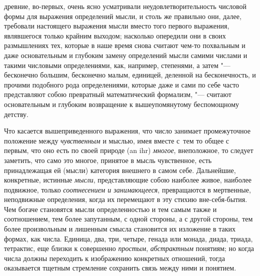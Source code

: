 древние, во-первых, очень ясно усматривали неудовлетворительность числовой
формы для выражения определений мысли, и столь же правильно они, далее,
требовали настоящего выражения мысли вместо того первого выражения, являвшегося
только крайним выходом; насколько опередили они в своих размышлениях тех,
которые в наше время снова считают чем-то похвальным и даже основательным и
глубоким замену определений мысли самими числами и такими числовыми
определениями, как, например, степенями, а затем "--- бесконечно большим,
бесконечно малым, единицей, деленной на бесконечность, и прочими подобного рода
определениями, которые даже и сами по себе часто представляют собою
превратный математический формализм, "--- считают основательным и глубоким
возвращение к вышеупомянутому беспомощному детству.

Что касается вышеприведенного выражения, что число занимает промежуточное
положение между {\em чувственным} и мыслью, имея вместе с~тем то общее с
первым, что оно есть по своей природе (an ihr) {\em многое}, внеположное, то
следует заметить, что само это многое, принятое в мысль чувственное, есть
принадлежащая ей (мысли) категория внешнего в самом себе. Дальнейшие,
конкретные, истинные {\em мысли}, представляющие собою наиболее живое, наиболее
подвижное, только {\em соотнесением и занимающееся}, превращаются в мертвенные,
неподвижные определения, когда их перемещают в эту стихию вне-себя-бытия. Чем
богаче становятся мысли определенностью и тем самым также и соотношением, тем
более запутанным, с одной стороны, а с другой стороны, тем более произвольным и
лишенным смысла становится их изложение в таких формах, как числа. Единица,
два, три, четыре, генада или монада, диада, триада, тетрактис, еще близки к
совершенно {\em простым}, {\em абстрактным} понятиям; но когда числа должны
переходить к изображению конкретных отношений, тогда оказывается тщетным
стремление сохранить связь между ними и понятием.

